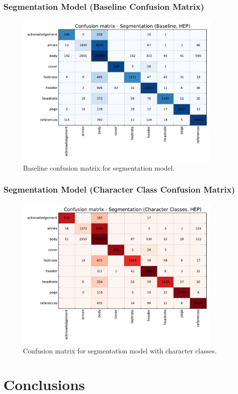 \documentclass{beamer}
\begin{document}
\begin{frame}
\frametitle{Segmentation Model (Baseline Confusion Matrix)}
\begin{figure}[h]
\center
\includegraphics[width=4in]{Figures/baseline_confusion_segmentation.pdf}
\caption{Baseline confusion matrix for segmentation model.}
\end{figure}
\end{frame}


\begin{frame}
\frametitle{Segmentation Model (Character Class Confusion Matrix)}
\begin{figure}[h]
\center
\includegraphics[width=4in]{Figures/classes_confusion_segmentation.pdf}
\caption{Confusion matrix for segmentation model with character classes.}
\end{figure}
\end{frame}


\section{Conclusions}
\end{document}
